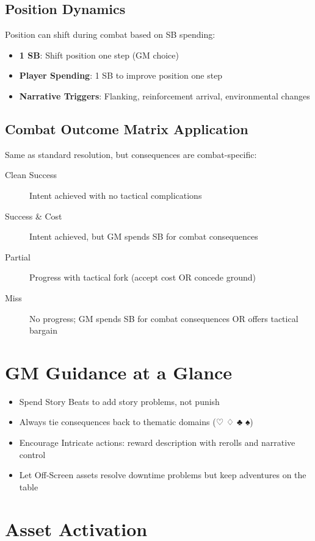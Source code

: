 \subsection*{Position Dynamics}
Position can shift during combat based on SB spending:
\begin{itemize}
  \item \textbf{1 SB}: Shift position one step (GM choice)
  \item \textbf{Player Spending}: 1 SB to improve position one step
  \item \textbf{Narrative Triggers}: Flanking, reinforcement arrival, environmental changes
\end{itemize}

\subsection*{Combat Outcome Matrix Application}
Same as standard resolution, but consequences are combat-specific:
\begin{description}
  \item[Clean Success] Intent achieved with no tactical complications
  \item[Success \& Cost] Intent achieved, but GM spends SB for combat consequences
  \item[Partial] Progress with tactical fork (accept cost OR concede ground)
  \item[Miss] No progress; GM spends SB for combat consequences OR offers tactical bargain
\end{description}

\section{GM Guidance at a Glance}

\begin{itemize}
  \item Spend Story Beats to add story problems, not punish
  \item Always tie consequences back to thematic domains (♡ ♢ ♣ ♠)
  \item Encourage Intricate actions: reward description with rerolls and narrative control
  \item Let Off-Screen assets resolve downtime problems but keep adventures on the table
\end{itemize}

\section{Asset Activation}

